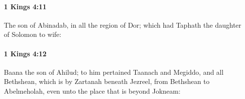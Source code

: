 		\paragraph{1 Kings 4:11} %
			\label{1KINGS-4-11}

			The son of Abinadab, in all the region of Dor; which had Taphath the daughter of Solomon to wife:


		\paragraph{1 Kings 4:12} %
			\label{1KINGS-4-12}

			Baana the son of Ahilud; to him pertained Taanach and Megiddo, and all Bethshean, which is by Zartanah beneath Jezreel, from Bethshean to Abelmeholah, even unto the place that is beyond Jokneam:


